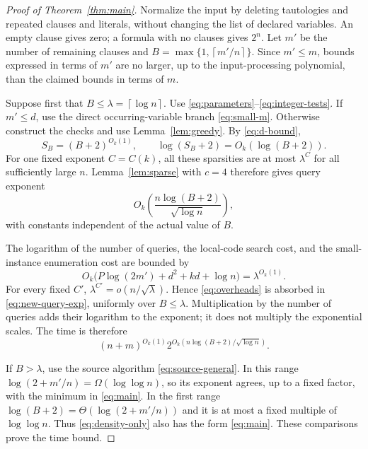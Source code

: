 \documentclass[11pt]{article}
\numberwithin{equation}{section}
\theoremstyle{definition}\newtheorem{definition}[theorem]{Definition}
\theoremstyle{remark}\newtheorem{remark}[theorem]{Remark}
\newcommand{\ceil}[1]{\left\lceil#1\right\rceil}
\begin{document}
\begin{proof}[Proof of Theorem~\ref{thm:main}]
Normalize the input by deleting tautologies and repeated clauses and
literals, without changing the list of declared variables. An empty
clause gives zero; a formula with no clauses gives $2^n$. Let $m'$
be the number of remaining clauses and
$B=\max\{1,\ceil{m'/n}\}$. Since $m'\le m$, bounds expressed in
terms of $m'$ are no larger, up to the input-processing polynomial,
than the claimed bounds in terms of $m$.

Suppose first that $B\le\lambda=\ceil{\log n}$. Use
\eqref{eq:parameters}--\eqref{eq:integer-tests}. If $m'\le d$, use
the direct occurring-variable branch \eqref{eq:small-m}. Otherwise
construct the checks and use Lemma~\ref{lem:greedy}.
By \eqref{eq:d-bound},
\begin{equation}\label{eq:uniform-s}
 S_B=(B+2)^{O_k(1)},\qquad
 \log(S_B+2)=O_k(\log(B+2)).
\end{equation}
For one fixed exponent $C=C(k)$, all these sparsities are at most
$\lambda^C$ for all sufficiently large $n$. Lemma~\ref{lem:sparse}
with $c=4$ therefore gives query exponent
\begin{equation}\label{eq:new-query-exp}
 O_k\!\left(\frac{n\log(B+2)}{\sqrt{\log n}}\right),
\end{equation}
with constants independent of the actual value of $B$.

The logarithm of the number of queries, the local-code search cost,
and the small-instance enumeration cost are bounded by
\begin{equation}\label{eq:overheads}
 O_k\bigl(P\log(2m')+d^2+kd+\log n\bigr)
      =\lambda^{O_k(1)}.
\end{equation}
For every fixed $C'$, $\lambda^{C'}=o(n/\sqrt\lambda)$.
Hence \eqref{eq:overheads} is absorbed in \eqref{eq:new-query-exp},
uniformly over $B\le\lambda$. Multiplication by the number of
queries adds their logarithm to the exponent; it does not multiply
the exponential scales. The time is therefore
\begin{equation}\label{eq:density-only}
 (n+m)^{O_k(1)}
 2^{O_k(n\log(B+2)/\sqrt{\log n})}.
\end{equation}

If $B>\lambda$, use the source algorithm
\eqref{eq:source-general}. In this range
$\log(2+m'/n)=\Omega(\log\log n)$, so its exponent agrees, up to
a fixed factor, with the minimum in \eqref{eq:main}. In the first
range $\log(B+2)=\Theta(\log(2+m'/n))$ and it is at most a fixed
multiple of $\log\log n$. Thus \eqref{eq:density-only} also has the
form \eqref{eq:main}. These comparisons prove the time bound.


\end{proof}
\end{document}
